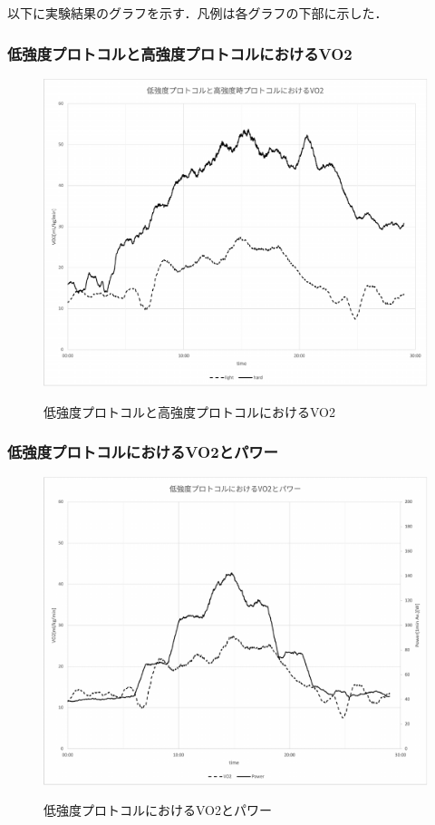 以下に実験結果のグラフを示す．凡例は各グラフの下部に示した．

\subsubsection{低強度プロトコルと高強度プロトコルにおけるVO2}

\begin{figure}[H]
  \begin{center}
    \label{fig:light_hard_vo2}
    \includegraphics[width=12cm]{fig/light_hard_vo2}
    \caption{低強度プロトコルと高強度プロトコルにおけるVO2}
  \end{center}
\end{figure}

\subsubsection{低強度プロトコルにおけるVO2とパワー}

\begin{figure}[H]
  \begin{center}
    \label{fig:light_vo2_power}
    \includegraphics[width=12cm]{fig/light_vo2_power}
    \caption{低強度プロトコルにおけるVO2とパワー}
  \end{center}
\end{figure}

